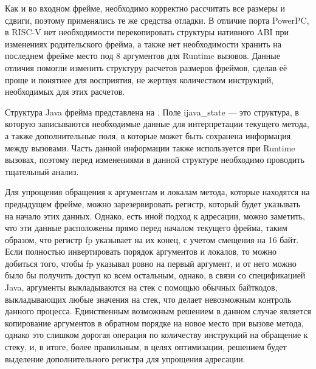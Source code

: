 Как и во входном фрейме, необходимо корректно рассчитать все размеры и сдвиги, поэтому применялись те же средства отладки. В отличие порта PowerPC, в RISC-V нет необходимости перекопировать структуры нативного ABI при изменениях родительского фрейма, а также нет необходимости хранить на последнем фрейме место под 8 аргументов для Runtime вызовов. Данные отличия помогли изменить структуру расчетов размеров фреймов, сделав её проще и понятнее для восприятия, не жертвуя количеством инструкций, необходимых для этих расчетов.


Структура Java фрейма представлена на . Поле ijava\_state --- это структура, в которую записываются необходимые данные для интерпретации текущего метода, а также дополнительные поля, в которые может быть сохранена информация между вызовами. Часть данной информации также используется при Runtime вызовах, поэтому перед изменениями в данной структуре необходимо проводить тщательный анализ.

Для упрощения обращения к аргументам и локалам метода, которые находятся на предыдущем фрейме, можно зарезервировать регистр, который будет указывать на начало этих данных. Однако, есть иной подход к адресации, можно заметить, что эти данные расположены прямо перед началом текущего фрейма, таким образом, что регистр fp указывает на их конец, с учетом смещения на 16 байт. Если полностью инвертировать порядок аргументов и локалов, то можно добиться того, чтобы fp указывал ровно на первый аргумент, и от него можно было бы получить доступ ко всем остальным, однако, в связи со спецификацией Java, аргументы выкладываются на стек с помощью обычных байткодов, выкладывающих любые значения на стек, что делает невозможным контроль данного процесса. Единственным возможным решением в данном случае является копирование аргументов в обратном порядке на новое место при вызове метода, однако это слишком дорогая операция по количеству инструкций на обращение к стеку, и, в итоге, более правильным, в целях оптимизации, решением будет выделение дополнительного регистра для упрощения адресации.

